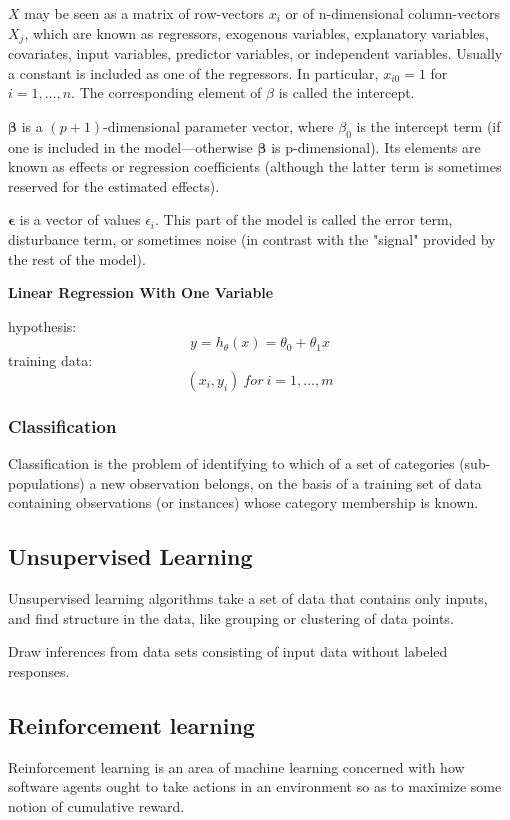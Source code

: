 \documentclass{article}
\begin{document}
\noindent \(X\) may be seen as a matrix of row-vectors \(x_{i}\) or of n-dimensional column-vectors \(X_{j}\), which are known as regressors, exogenous variables, explanatory variables, covariates, input variables, predictor variables, or independent variables. Usually a constant is included as one of the regressors. In particular, \(x_{i0} = 1\) for \(i = 1, \dots, n\). The corresponding element of \(\beta\) is called the intercept. 

\bigskip

\noindent \(\boldsymbol{\beta}\) is a \((p + 1)\)-dimensional parameter vector, where \(\beta_{0}\) is the intercept term (if one is included in the model—otherwise \(\boldsymbol{\beta}\) is p-dimensional). Its elements are known as effects or regression coefficients (although the latter term is sometimes reserved for the estimated effects).

\bigskip

\noindent \(\boldsymbol{\epsilon}\) is a vector of values \(\epsilon_{i}\). This part of the model is called the error term, disturbance term, or sometimes noise (in contrast with the "signal" provided by the rest of the model).

\bigskip

\noindent \textbf{Linear Regression With One Variable}

\bigskip

\noindent hypothesis:
\[y = h_{\theta}(x) = \theta_0 + \theta_1x\]
\noindent training data:
\[(x_i, y_i)\:for\:i = 1, \dots, m\]

\subsubsection{Classification}

Classification is the problem of identifying to which 
of a set of categories (sub-populations) a new observation 
belongs, on the basis of a training set of data containing 
observations (or instances) whose category membership is known.

\subsection{Unsupervised Learning}

Unsupervised learning algorithms take a set of data that 
contains only inputs, and find structure in the data, like 
grouping or clustering of data points.

\bigskip

\noindent Draw inferences from data sets consisting of input 
data without labeled responses.

\subsection{Reinforcement learning}
       
Reinforcement learning is an area of machine learning concerned 
with how software agents ought to take actions in an environment 
so as to maximize some notion of cumulative reward.

\printindex
\end{document}
